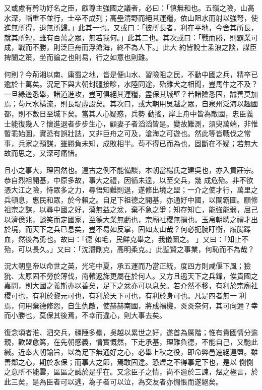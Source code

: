 \begin{pinyinscope}
 又或慮有矜功好名之臣，獻尊主強國之議者，必曰：「慎無和也。五嶺之險，山高水深，輜重不並行，士卒不成列；高壘清野而絕其運糧，依山阻水而射以強弩，使進無所得，退無所歸。」此其一也。又或曰：「彼所長者，利在平地，今舍其所長，就其所短，雖有百萬之眾，無若我何。」此其二也。其次或曰：「戰而勝，則霸業可成，戰而不勝，則泛巨舟而浮滄海，終不為人下。」此大
 約皆說士孟浪之談，謀臣捭闔之策，坐而論之也則易，行之如意也則難。



 何則？今荊湘以南、庸蜀之地，皆是便山水、習險阻之民，不動中國之兵，精卒已逾於十萬矣。況足下與大朝封疆接畛，水陸同途，殆雞犬之相聞，豈馬牛之不及？一旦緣邊悉舉，諸道進攻，豈可俱絕其運糧，盡保其城壁？若諸險悉固，誠善莫加焉；苟尺水橫流，則長堤虛設矣。其次曰，或大朝用吳越之眾，自泉州泛海以趣國都，則不數日至城下矣。當其人心疑惑，兵勢
 動搖，岸上舟中皆為敵國，忠臣義士能復幾人？懷進退者步步生心，顧妻子者滔滔皆是。變故難測，須臾萬端，非惟暫乖始圖，實恐有誤壯誌，又非巨舟之可及，滄海之可遊也。然此等皆戰伐之常事，兵家之預謀，雖勝負未知，成敗相半。苟不得已而為也，固斷在不疑；若無大故而思之，又深可痛惜。



 且小之事大，理固然也。遠古之例不能備談，本朝當楊氏之建吳也，亦入貢莊宗。恭自烈祖開基，中原多故，事大之禮，因循未遑，以至交兵，幾
 成危殆。非不欲憑大江之險，恃眾多之力，尋悟知難則退，遂修出境之盟；一介之使才行，萬里之兵頓息，惠民和眾，於今賴之。自足下祖德之開基，亦通好中國，以闡霸圖。願修祖宗之謀，以尋中國之好，蕩無益之忿，棄不急之爭；知存知亡，能強能弱，屈己以濟億兆，談笑而定國家，至德大業無虧也，宗廟社稷無損也。玉帛朝聘之禮才出於境，而天下之兵已息矣，豈不易如反掌，固如太山哉？何必扼腕盱衡，履腸蹀血，然後為勇也。故曰：「德
 如毛，民鮮克舉之，我儀圖之。 」又曰：「知止不殆，可以長久。」又曰：「沈潛剛克，高明柔克。」此聖賢之事業，何恥而不為哉？



 況大朝皇帝以命世之英，光宅中夏，承五運而乃當正統，度四方則咸偃下風；獫狁、太原固不勞於薄伐，南轅返旆更屬在於何人。又方且遏天下之兵鋒，俟貴國之嘉問，則大國之義斯亦以善矣，足下之忿亦可以息矣。若介然不移，有利於宗廟社稷可也，有利於黎元可也，有利於天下可也，有利於身可也。凡是四者無一
 利焉，何用棄德修怨，自生仇敵，使赫赫南國，將成禍機，炎炎奈何，其可向邇？幸而小勝也，莫保其後焉，不幸而違心，則大事去矣。



 復念頃者淮、泗交兵，疆陲多壘，吳越以累世之好，遂首為厲階；惟有貴國情分逾親，歡盟愈篤，在先朝感義，情實慨然，下走承基，理難負德，不能自己，又馳此緘。近奉大朝諭旨，以為足下無通好之心，必舉上秋之役，即命弊邑速絕連盟。雖善鄰之心，期於永保；而事大之節，焉敢固違。恐煜之不得事足下也，是以
 惻惻之意所不能雲，區區之誠於是乎在。又念臣子之情，尚不逾於三諫，煜之極言，於此三矣，是為臣者可以逃，為子者可以泣，為交友者亦惆悵而遂絕矣。




\end{pinyinscope}
